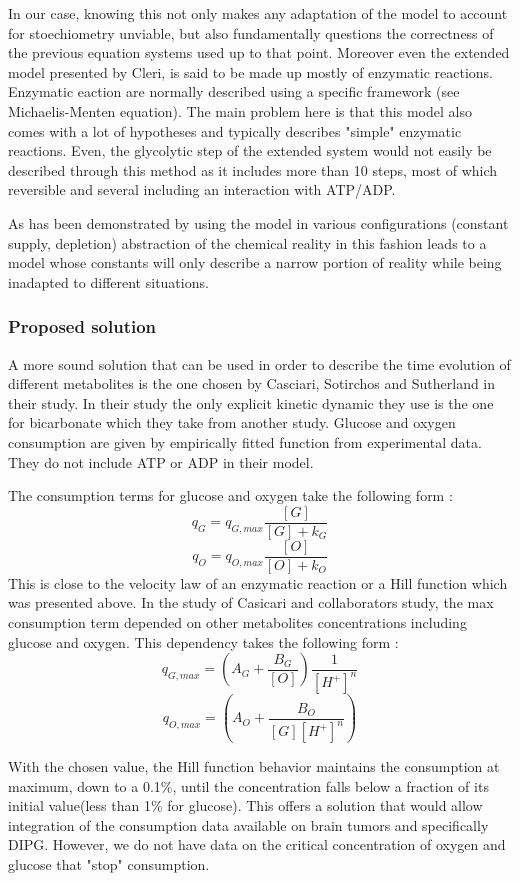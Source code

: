 \documentclass[11pt,a4paper]{article}
\begin{document}
In our case, knowing this not only makes any adaptation of the model to account for stoechiometry unviable, but also fundamentally questions the correctness of the previous equation systems used up to that point. Moreover even the extended model presented by Cleri, is said to be made up mostly of enzymatic reactions. Enzymatic eaction are normally described using a specific framework (see Michaelis-Menten equation). The main problem here is that this model also comes with a lot of hypotheses and typically describes "simple" enzymatic reactions. Even, the glycolytic step of the extended system would not easily be described through this method as it includes more than 10 steps, most of which reversible and several including an interaction with ATP/ADP.

As has been demonstrated by using the model in various configurations (constant supply, depletion)  abstraction of the chemical reality in this fashion leads to a model whose constants will only describe a narrow portion of reality while being inadapted to different situations.

\subsubsection{Proposed solution}
A more sound solution that can be used  in order to describe the time evolution of different metabolites is the one chosen by Casciari, Sotirchos and Sutherland in their study.\cite{Casciari1992} In their study the only explicit kinetic dynamic they use is the one for bicarbonate which they take from another study. Glucose and oxygen consumption are given by empirically fitted function from experimental data. They do not include  ATP or ADP in their model.

The consumption terms for glucose and oxygen take the following form : 
\[q_G = q_{G,max} \frac{[G]}{[G] + k_G} \]
\[q_O = q_{O,max} \frac{[O]}{[O] + k_O} \] 
This is close to the velocity law of an enzymatic reaction or a Hill function which  was presented above. In the study of Casicari and collaborators study, the max consumption term depended on other metabolites concentrations including glucose and oxygen. 
This dependency takes the following form : 
\[ q_{G,max} = (A_G + \frac{B_G}{[O]})\frac{1}{[H^+]^n}\]
\[ q_{O,max} = (A_O + \frac{B_O}{[G][H^+]^n})\]

With the chosen value, the Hill function behavior maintains the consumption at maximum, down to a 0.1\%, until the concentration falls below a fraction of its initial value(less than 1\% for glucose). This offers a solution that would allow integration of the consumption data available on brain tumors and specifically DIPG. However, we do not have data on the critical concentration of oxygen and glucose that "stop" consumption.
\end{document}
